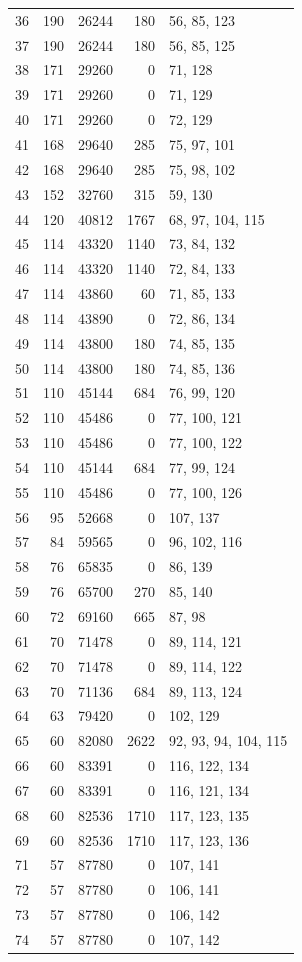 \documentclass[10pt,a4paper]{article}
\begin{document}
\begin{longtable}{r r r r p{57mm}}
36&190&26244&180&56, 85, 123\\
37&190&26244&180&56, 85, 125\\
38&171&29260&0&71, 128\\
39&171&29260&0&71, 129\\
40&171&29260&0&72, 129\\
41&168&29640&285&75, 97, 101\\
42&168&29640&285&75, 98, 102\\
43&152&32760&315&59, 130\\
44&120&40812&1767&68, 97, 104, 115\\
45&114&43320&1140&73, 84, 132\\
46&114&43320&1140&72, 84, 133\\
47&114&43860&60&71, 85, 133\\
48&114&43890&0&72, 86, 134\\
49&114&43800&180&74, 85, 135\\
50&114&43800&180&74, 85, 136\\
51&110&45144&684&76, 99, 120\\
52&110&45486&0&77, 100, 121\\
53&110&45486&0&77, 100, 122\\
54&110&45144&684&77, 99, 124\\
55&110&45486&0&77, 100, 126\\
56&95&52668&0&107, 137\\
57&84&59565&0&96, 102, 116\\
58&76&65835&0&86, 139\\
59&76&65700&270&85, 140\\
60&72&69160&665&87, 98\\
61&70&71478&0&89, 114, 121\\
62&70&71478&0&89, 114, 122\\
63&70&71136&684&89, 113, 124\\
64&63&79420&0&102, 129\\
65&60&82080&2622&92, 93, 94, 104, 115\\
66&60&83391&0&116, 122, 134\\
67&60&83391&0&116, 121, 134\\
68&60&82536&1710&117, 123, 135\\
69&60&82536&1710&117, 123, 136\\
71&57&87780&0&107, 141\\
72&57&87780&0&106, 141\\
73&57&87780&0&106, 142\\
74&57&87780&0&107, 142\\

\end{longtable}
\end{document}

